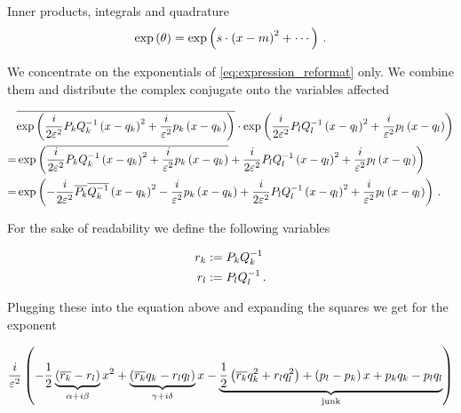 \begin{chapter}{Inner products, integrals and quadrature}
\begin{equation} \label{eq:expression_format_exponential}
  \exp\left( \theta \right) = \exp\left(s \cdot \left(x-m\right)^2 + \cdots \right) \,.
\end{equation}

We concentrate on the exponentials of \eqref{eq:expression_reformat} only. We combine
them and distribute the complex conjugate onto the variables affected

\begin{equation*}
\begin{split}
    & \overline{\exp\left(\frac{i}{2\varepsilon^2} P_k Q_k^{-1} \left(x-q_k\right)^2 + \frac{i}{\varepsilon^2} p_k \left( x-q_k \right)\right)}
      \cdot \exp\left(\frac{i}{2\varepsilon^2} P_l Q_l^{-1} \left(x-q_l\right)^2 + \frac{i}{\varepsilon^2} p_l \left( x-q_l \right)\right) \\
  = & \exp\left(\overline{\frac{i}{2\varepsilon^2} P_k Q_k^{-1} \left(x-q_k\right)^2 + \frac{i}{\varepsilon^2} p_k \left( x-q_k \right)}
              + \frac{i}{2\varepsilon^2} P_l Q_l^{-1} \left(x-q_l\right)^2 + \frac{i}{\varepsilon^2} p_l \left( x-q_l \right) \right) \\
  = & \exp\left( -\frac{i}{2\varepsilon^2} \overline{P_k} \overline{Q_k^{-1}} \left(x-q_k\right)^2 - \frac{i}{\varepsilon^2} p_k \left( x-q_k \right)
              + \frac{i}{2\varepsilon^2} P_l Q_l^{-1} \left(x-q_l\right)^2 + \frac{i}{\varepsilon^2} p_l \left( x-q_l \right) \right) \,.
\end{split}
\end{equation*}

For the sake of readability we define the following variables

\begin{equation}
\begin{split}
  r_k & := P_k Q_k^{-1} \\
  r_l & := P_l Q_l^{-1} \,.
\end{split}
\end{equation}

Plugging these into the equation above and expanding the squares we get for the
exponent

\begin{equation*}
  \frac{i}{\varepsilon^2} \left( - \frac{1}{2}\underbrace{\left(\overline{r_k}-r_l\right)}_{\alpha + i \beta} x^2
                                 + \underbrace{\left(\overline{r_k}q_k-r_l q_l\right)}_{\gamma + i \delta} x
                                 - \underbrace{\frac{1}{2}\left(\overline{r_k}q_k^2 + r_l q_l^2\right)
                                 + \left(p_l-p_k\right) x
                                 + p_k q_k - p_l q_l}_{\text{junk}}
                          \right)
\end{equation*}


\end{chapter}
